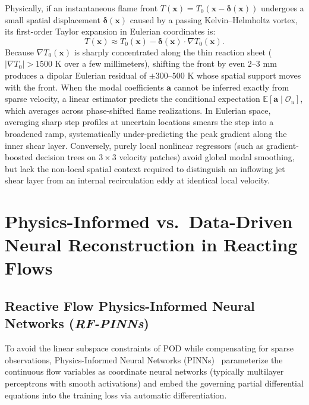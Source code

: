 Physically, if an instantaneous flame front $T(\mathbf{x}) = T_0(\mathbf{x} - \boldsymbol{\delta}(\mathbf{x}))$ undergoes a small spatial displacement $\boldsymbol{\delta}(\mathbf{x})$ caused by a passing Kelvin--Helmholtz vortex, its first-order Taylor expansion in Eulerian coordinates is:
\begin{equation}
    T(\mathbf{x}) \approx T_0(\mathbf{x}) - \boldsymbol{\delta}(\mathbf{x}) \cdot \nabla T_0(\mathbf{x}).
    \label{eq:bg_eulerian_shift}
\end{equation}
Because $\nabla T_0(\mathbf{x})$ is sharply concentrated along the thin reaction sheet ($|\nabla T_0| > 1500\text{ K}$ over a few millimeters), shifting the front by even $2\text{--}3\text{ mm}$ produces a dipolar Eulerian residual of $\pm 300\text{--}500\text{ K}$ whose spatial support moves with the front. When the modal coefficients $\mathbf{a}$ cannot be inferred exactly from sparse velocity, a linear estimator predicts the conditional expectation $\mathbb{E}[\mathbf{a} \mid \mathcal{O}_u]$, which averages across phase-shifted flame realizations. In Eulerian space, averaging sharp step profiles at uncertain locations smears the step into a broadened ramp, systematically under-predicting the peak gradient along the inner shear layer. Conversely, purely local nonlinear regressors (such as gradient-boosted decision trees on $3 \times 3$ velocity patches) avoid global modal smoothing, but lack the non-local spatial context required to distinguish an inflowing jet shear layer from an internal recirculation eddy at identical local velocity.

\section{Physics-Informed vs.\ Data-Driven Neural Reconstruction in Reacting Flows}
\label{sec:bg_pinns}

\subsection{Reactive Flow Physics-Informed Neural Networks (\textit{RF-PINNs})}
\label{subsec:bg_rfpinns}

To avoid the linear subspace constraints of POD while compensating for sparse observations, Physics-Informed Neural Networks (PINNs)~\cite{raissi2019physics, cai2021physics} parameterize the continuous flow variables as coordinate neural networks (typically multilayer perceptrons with smooth activations) and embed the governing partial differential equations into the training loss via automatic differentiation.

